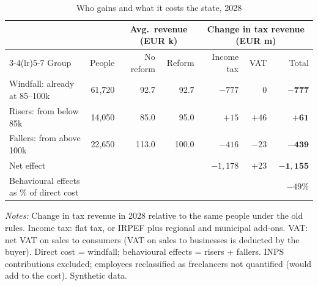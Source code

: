 \begin{table}[t]
\centering
\begin{threeparttable}
\caption{Who gains and what it costs the state, 2028}
\label{tab:fiscal}
\small\setlength{\tabcolsep}{4.5pt}
\begin{tabular}{lrrrrrr}
\toprule
 & & \multicolumn{2}{c}{Avg.\ revenue (EUR k)} & \multicolumn{3}{c}{Change in tax revenue (EUR m)} \\
\cmidrule(lr){3-4}\cmidrule(lr){5-7}
Group & People & No reform & Reform & Income tax & VAT & Total \\
\midrule
Windfall: already at 85--100k & 61{,}720 & 92.7 & 92.7 & $-777$ & $0$ & $\mathbf{-777}$ \\
Risers: from below 85k & 14{,}050 & 85.0 & 95.0 & $+15$ & $+46$ & $\mathbf{+61}$ \\
Fallers: from above 100k & 22{,}650 & 113.0 & 100.0 & $-416$ & $-23$ & $\mathbf{-439}$ \\
\midrule
Net effect & & & & $-1{,}178$ & $+23$ & $\mathbf{-1{,}155}$ \\
Behavioural effects as \% of direct cost & & & & & & $-49\%$ \\
\bottomrule
\end{tabular}
\begin{tablenotes}[flushleft]\footnotesize
\item \textit{Notes:} Change in tax revenue in 2028 relative to the same people under the old rules. Income tax:
flat tax, or IRPEF plus regional and municipal add-ons. VAT: net VAT on sales to consumers (VAT on sales to
businesses is deducted by the buyer). Direct cost = windfall; behavioural effects = risers + fallers. INPS
contributions excluded; employees reclassified as freelancers not quantified (would add to the cost). Synthetic data.
\end{tablenotes}
\end{threeparttable}
\end{table}
